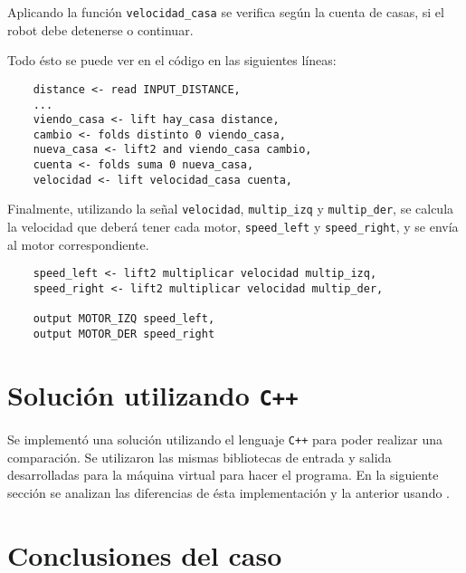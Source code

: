   Aplicando la función \texttt{velocidad\_casa} se verifica
según la cuenta de casas, si el robot debe detenerse o continuar.

  Todo ésto se puede ver en el código en las siguientes líneas:

  \begin{verbatim}
    distance <- read INPUT_DISTANCE,
    ...
    viendo_casa <- lift hay_casa distance,
    cambio <- folds distinto 0 viendo_casa,
    nueva_casa <- lift2 and viendo_casa cambio,
    cuenta <- folds suma 0 nueva_casa,
    velocidad <- lift velocidad_casa cuenta,
  \end{verbatim}

  Finalmente, utilizando la señal \texttt{velocidad}, \texttt{multip\_izq}
  y \texttt{multip\_der}, se calcula la velocidad que deberá tener cada
  motor, \texttt{speed\_left} y \texttt{speed\_right}, y se envía al
  motor correspondiente.

  \begin{verbatim}
    speed_left <- lift2 multiplicar velocidad multip_izq,
    speed_right <- lift2 multiplicar velocidad multip_der,

    output MOTOR_IZQ speed_left,
    output MOTOR_DER speed_right
  \end{verbatim}

\section{Solución utilizando \texttt{C++}}

  Se implementó una solución utilizando el lenguaje \texttt{C++} para
poder realizar una comparación.
  Se utilizaron las mismas bibliotecas de entrada y salida desarrolladas
para la máquina virtual para hacer el programa.
  En la siguiente sección se analizan las diferencias de ésta
implementación y la anterior usando \frob{}.



\section {Conclusiones del caso}


